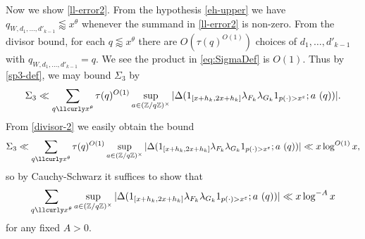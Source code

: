 Now we show \eqref{ll-error2}.  From the hypothesis \eqref{eh-upper} we have $q_{W,d_1,\dots,d'_{k-1}} \lessapprox x^\theta$ whenever the summand in \eqref{ll-error2} is non-zero.  From the divisor bound, for each $q \lessapprox x^\theta$ there are $O( \tau(q)^{O(1)})$ choices of $d_1,\dots,d'_{k-1}$ with $q_{W,d_1,\dots,d'_{k-1}} = q$. We see the product in \eqref{eq:SigmaDef} is $O(1)$. Thus by \eqref{sp3-def}, we may bound $\Sigma_3$ by
$$
\Sigma_3 \ll \sum_{q \lessapprox x^\theta} \tau(q)^{O(1)} \sup_{a \in (\Z/q\Z)^\times} |\Delta( 1_{[x+h_k,2x+h_k]} \lambda_{F_k} \lambda_{G_k} 1_{p(\cdot) > x^\eps};  a\ (q))|.
$$
From \eqref{divisor-2} we easily obtain the bound
$$
\Sigma_3\ll \sum_{q \lessapprox x^\theta} \tau(q)^{O(1)} \sup_{a \in (\Z/q\Z)^\times} |\Delta( 1_{[x+h_k,2x+h_k]} \lambda_{F_k} \lambda_{G_k} 1_{p(\cdot) > x^\eps};  a\ (q))| \ll x \log^{O(1)} x,
$$
so by Cauchy-Schwarz it suffices to show that
\begin{equation}\label{local}
\sum_{q \lessapprox x^\theta} \sup_{a \in (\Z/q\Z)^\times} |\Delta( 1_{[x+h_k,2x+h_k]} \lambda_{F_k} \lambda_{G_k} 1_{p(\cdot) > x^\eps};  a\ (q))| \ll x \log^{-A} x
\end{equation}
for any fixed $A>0$.

